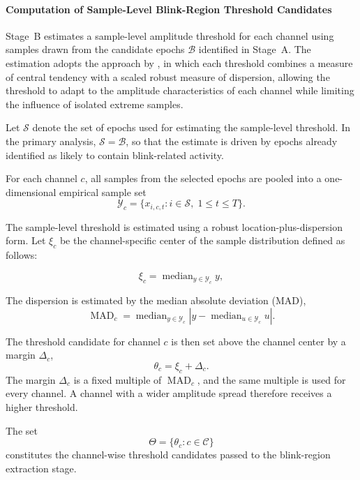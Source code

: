 \paragraph{Computation of Sample-Level Blink-Region Threshold Candidates}


Stage~B estimates a sample-level amplitude threshold for each channel using samples drawn from the candidate epochs $\mathcal{B}$ identified in Stage~A.
The estimation adopts the approach by \citep{kleifges2017blinker}, in which each threshold combines a measure of central tendency with a scaled robust measure of dispersion, allowing the threshold to adapt to the amplitude characteristics of each channel while limiting the influence of isolated extreme samples.


Let \(\mathcal{S}\) denote the set of epochs used for estimating the
sample-level threshold. In the primary analysis,
\(\mathcal{S}=\mathcal{B}\), so that the estimate is driven by epochs already
identified as likely to contain blink-related activity.


For each channel \(c\), all samples from the selected epochs are pooled into a
one-dimensional empirical sample set
\begin{equation}
\mathcal{Y}_c
= \{x_{i,c,t}: i \in \mathcal{S},\; 1 \leq t \leq T\}.
\end{equation}

The sample-level threshold is estimated using a robust location-plus-dispersion form. Let \(\xi_c\) be the channel-specific center of the sample distribution
defined as follows:

\begin{equation}
\xi_c = \operatorname{median}_{y \in \mathcal{Y}_c} y,
\end{equation}


The dispersion is estimated by the median absolute
deviation (MAD),
\begin{equation}
\operatorname{MAD}_c
= \operatorname{median}_{y \in \mathcal{Y}_c}
\left|y-\operatorname{median}_{u \in \mathcal{Y}_c}u\right|.
\end{equation}

The threshold candidate for channel \(c\) is then set above the channel center by a margin \(\Delta_c\),
\begin{equation}
\theta_c = \xi_c + \Delta_c .
\end{equation}
The margin \(\Delta_c\) is a fixed multiple of \(\operatorname{MAD}_c\), and the same multiple is used for every channel. A channel with a wider amplitude spread therefore receives a higher threshold.

The set
\begin{equation}
\Theta = \{\theta_c: c \in \mathcal{C}\}
\end{equation}
constitutes the channel-wise threshold candidates passed to the blink-region extraction stage.
